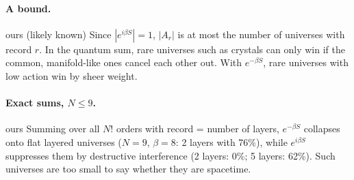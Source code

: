 \documentclass[11pt,a4paper]{article}
\newcommand{\tagbox}[2]{\textsf{\scriptsize\colorbox{#1!12}{\textcolor{#1!70!black}{#2}}}}
\newcommand{\ours}{\tagbox{orange}{ours}}
\begin{document}
\paragraph{A bound.} \ours{} (likely known) Since $|e^{i\beta S}|=1$, $|A_r|$ is at most the number of universes with record $r$. In the quantum sum, rare universes such as crystals can only win if the common, manifold-like ones cancel each other out. With $e^{-\beta S}$, rare universes with low action win by sheer weight.

\paragraph{Exact sums, $N\le9$.} \ours{} Summing over all $N!$ orders with record = number of layers, $e^{-\beta S}$ collapses onto flat layered universes ($N=9$, $\beta=8$: 2 layers with 76\%), while $e^{i\beta S}$ suppresses them by destructive interference (2 layers: 0\%; 5 layers: 62\%). Such universes are too small to say whether they are spacetime.
\end{document}
